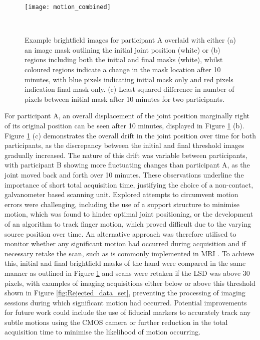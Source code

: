 \documentclass[twoside]{bhamthesis}
\theoremstyle{definition}
\begin{document}
\begin{figure}[!ht]
\texttt{[image: motion\_combined]}
\centering
\caption{Example brightfield images for participant A overlaid with either (a) an image mask outlining the initial joint position (white) or (b) regions including both the initial and final masks (white), whilst coloured regions indicate a change in the mask location after 10 minutes, with blue pixels indicating initial mask only and red pixels indication final mask only. (c) Least squared difference in number of pixels between initial mask after 10 minutes for two participants.}
  \label{fig:Motion_masks}\
\end{figure}

For participant A, an overall displacement of the joint position marginally right of its original position can be seen after 10 minutes, displayed in Figure \ref{fig:Motion_masks} (b). Figure \ref{fig:Motion_masks} (c) demonstrates the overall drift in the joint position over time for both participants, as the discrepancy between the initial and final threshold images gradually increased. The nature of this drift was variable between participants, with participant B showing more fluctuating changes than participant A, as the joint moved back and forth over 10 minutes. These observations underline the importance of short total acquisition time, justifying the choice of a non-contact, galvanometer based scanning unit. Explored attempts to circumvent motion errors were challenging, including the use of a support structure to minimise motion, which was found to hinder optimal joint positioning, or the development of an algorithm to track finger motion, which proved difficult due to the varying source position over time. An alternative approach was therefore utilised to monitor whether any significant motion had occurred during acquisition and if necessary retake the scan, such as is commonly implemented in MRI \cite{dosenbach2017real}. To achieve this, initial and final brightfield masks of the hand were compared in the same manner as outlined in Figure \ref{fig:Motion_masks} and scans were retaken if the LSD was above 30 pixels, with examples of imaging acquisitions either below or above this threshold shown in Figure \ref{fig:Rejected_data_set}, preventing the processing of imaging sessions during which significant motion had occurred. Potential improvements for future work could include the use of fiducial markers to accurately track any subtle motions using the CMOS camera or further reduction in the total acquisition time to minimise the likelihood of motion occurring. 
\end{document}
